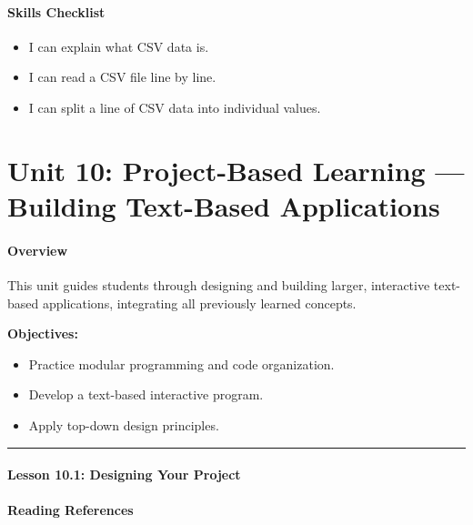 \documentclass[
  justified,
  openright,
]{tufte-book}
\let\subsection\paragraph
\let\paragraph\paragraph
\let\subsection\paragraph
\let\paragraph\paragraph
\providecommand{\tightlist}{%
  \setlength{\itemsep}{0pt}\setlength{\parskip}{0pt}}
\begin{document}
\subsection{Skills Checklist}\label{skills-checklist-46}

\begin{itemize}
\tightlist
\item[$\square$]
  I can explain what CSV data is.
\item[$\square$]
  I can read a CSV file line by line.
\item[$\square$]
  I can split a line of CSV data into individual values.
\end{itemize}

\newpage

\section{Unit 10: Project-Based Learning --- Building Text-Based
Applications}\label{unit-10-project-based-learning-building-text-based-applications}

\subsection{Overview}\label{overview-10}

This unit guides students through designing and building larger,
interactive text-based applications, integrating all previously learned
concepts.

\textbf{Objectives:}

\begin{itemize}
\tightlist
\item
  Practice modular programming and code organization.
\item
  Develop a text-based interactive program.
\item
  Apply top-down design principles.
\end{itemize}

\begin{center}\rule{0.5\linewidth}{0.5pt}\end{center}

\subsection{Lesson 10.1: Designing Your
Project}\label{lesson-10.1-designing-your-project}

\subsection{Reading References}\label{reading-references-28}
\end{document}
